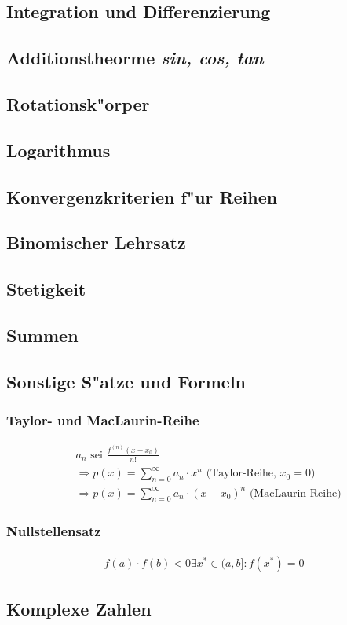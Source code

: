 \subsection{Integration und Differenzierung}

\subsection{Additionstheorme \textit{sin, cos, tan}}

\subsection{Rotationsk"orper}

\subsection{Logarithmus}

\subsection{Konvergenzkriterien f"ur Reihen}

\subsection{Binomischer Lehrsatz}

\subsection{Stetigkeit}

\subsection{Summen}

\subsection{Sonstige S"atze und Formeln}
	\subsubsection{Taylor- und MacLaurin-Reihe}
		\begin{align}
			&a_n \mbox{ sei } \frac{f^{(n)}(x-x_0)}{n!} \\
			&\Rightarrow p(x) = \sum_{n=0}^{\infty} a_n \cdot x^n \mbox{ (Taylor-Reihe, } x_0=0 \mbox{)} \\
			&\Rightarrow p(x) = \sum_{n=0}^{\infty} a_n \cdot (x-x_0)^n \mbox{ (MacLaurin-Reihe)}
		\end{align}

	\subsubsection{Nullstellensatz}
		\begin{align}
			f(a) \cdot f(b) < 0 \exists x^* \in (a, b]: f(x^*) = 0 
		\end{align}

\subsection{Komplexe Zahlen}
